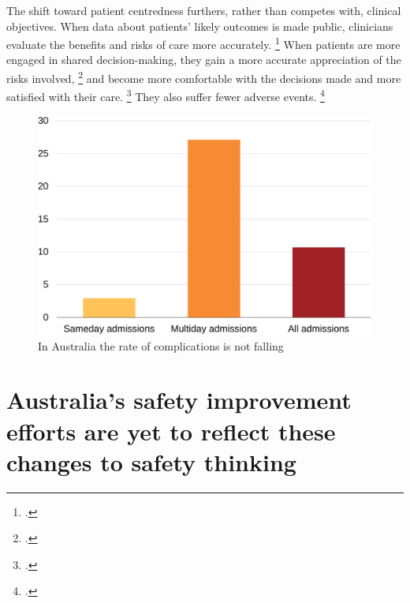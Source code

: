 \documentclass[FrontPage]{grattan}
\begin{document}
The shift toward patient centredness furthers, rather than competes with, clinical objectives.
When data about patients' likely outcomes is made public, clinicians evaluate the benefits and risks of care more accurately.%
	\footcite{sacks2016impact}
When patients are more engaged in shared decision-making, they gain a more accurate appreciation of the risks involved,%
	\footcite{Stacey_2017}
and become more comfortable with the decisions made and more satisfied with their care.%
	\footcites{boss2016shared}{walsh2014undetermined}{Stacey_2017}
They also suffer fewer adverse events.%
	\footcites{schiffinger2016two}{holzmueller2012framework}{Weingart-etal-2011-Patient-participation}



\begin{figure}
\caption{In Australia the rate of complications is not falling}\label{fig:1-3-rate-of-complications-not-falling}
\includegraphics[page=2]{atlas/comps_charts.pdf}
\end{figure}

\section{Australia's safety improvement efforts are yet to reflect these changes to safety thinking}\label{sec:australias-safety-improvement-efforts-are-yet-to-reflect-these-changes-to-safety-thinking}
\end{document}
